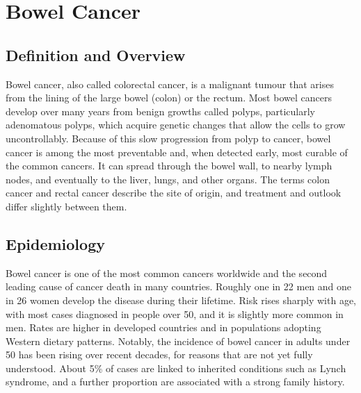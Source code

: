 \chapter{Bowel Cancer}

\section*{Definition and Overview}
Bowel cancer, also called colorectal cancer, is a malignant tumour that arises from the lining of the large bowel (colon) or the rectum. Most bowel cancers develop over many years from benign growths called polyps, particularly adenomatous polyps, which acquire genetic changes that allow the cells to grow uncontrollably. Because of this slow progression from polyp to cancer, bowel cancer is among the most preventable and, when detected early, most curable of the common cancers. It can spread through the bowel wall, to nearby lymph nodes, and eventually to the liver, lungs, and other organs. The terms colon cancer and rectal cancer describe the site of origin, and treatment and outlook differ slightly between them.

\section*{Epidemiology}
Bowel cancer is one of the most common cancers worldwide and the second leading cause of cancer death in many countries. Roughly one in 22 men and one in 26 women develop the disease during their lifetime. Risk rises sharply with age, with most cases diagnosed in people over 50, and it is slightly more common in men. Rates are higher in developed countries and in populations adopting Western dietary patterns. Notably, the incidence of bowel cancer in adults under 50 has been rising over recent decades, for reasons that are not yet fully understood. About 5\% of cases are linked to inherited conditions such as Lynch syndrome, and a further proportion are associated with a strong family history.

